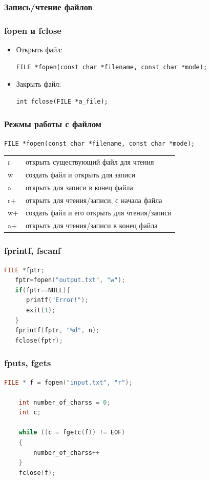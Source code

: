 \documentclass[14pt,pdf,hyperref={unicode}]{beamer}
\begin{document}
\begin{frame}[fragile]
\frametitle{Запись/чтение файлов} 
\frametitle{fopen и fclose} 
\begin{itemize}
\item Открыть файл:
\begin{lstlisting}
FILE *fopen(const char *filename, const char *mode);
\end{lstlisting}
\item Закрыть файл:
\begin{lstlisting}
int fclose(FILE *a_file);
\end{lstlisting}
\end{itemize}
\end{frame}

\begin{frame}[fragile]
\frametitle{Режмы работы с файлом} 
\begin{lstlisting}
FILE *fopen(const char *filename, const char *mode);
\end{lstlisting}
\begin{tabular}{ l || l }
  r & открыть существующий файл для чтения \\
  w & создать файл и открыть для записи \\
  a & открыть для записи в конец файла \\
  r+ & открыть для чтения/записи, с начала файла  \\
  w+ & создать файл и его открыть для чтения/записи \\
  a+ & открыть для чтения/записи в конец файла \\
\end{tabular}
\end{frame}

\begin{frame}[fragile]
\frametitle{fprintf, fscanf}  
\begin{lstlisting}[language=C++,basicstyle=\ttfamily,keywordstyle=\color{blue},
                stringstyle=\color{orange}\ttfamily]
   FILE *fptr;
   fptr=fopen("output.txt", "w");
   if(fptr==NULL){
      printf("Error!");   
      exit(1);             
   }
   fprintf(fptr, "%d", n);   
   fclose(fptr);
\end{lstlisting}
\end{frame}


\begin{frame}[fragile]
\frametitle{fputs, fgets}  
\begin{lstlisting}[language=C++,basicstyle=\ttfamily,keywordstyle=\color{blue},stringstyle=\color{orange}\ttfamily]
	FILE * f = fopen("input.txt", "r");
    
	int number_of_charss = 0;
	int c;

	while ((c = fgetc(f)) != EOF)
	{
	    number_of_charss++
	}
	fclose(f);
\end{lstlisting}
\end{frame}
\end{document}
